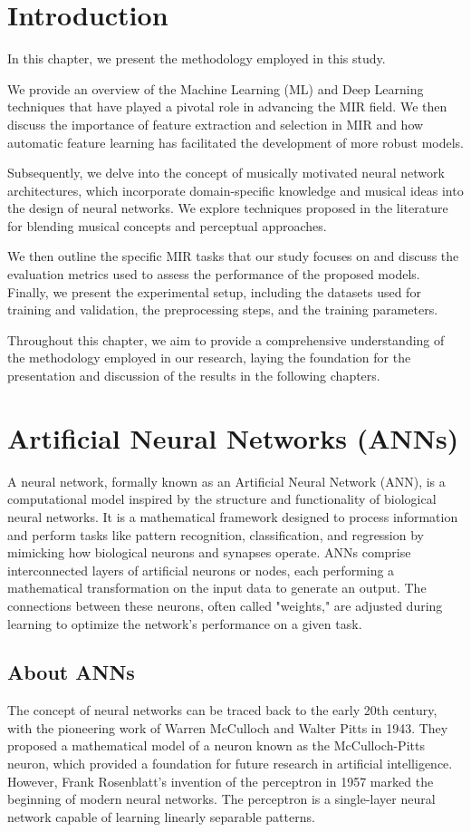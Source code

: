 \section{Introduction}

In this chapter, we present the methodology employed in this study.

We provide an overview of the Machine Learning (ML) and Deep Learning techniques that have played a pivotal role in advancing the MIR field. We then discuss the importance of feature extraction and selection in MIR and how automatic feature learning has facilitated the development of more robust models.

Subsequently, we delve into the concept of musically motivated neural network architectures, which incorporate domain-specific knowledge and musical ideas into the design of neural networks. We explore techniques proposed in the literature for blending musical concepts and perceptual approaches.

We then outline the specific MIR tasks that our study focuses on and discuss the evaluation metrics used to assess the performance of the proposed models. Finally, we present the experimental setup, including the datasets used for training and validation, the preprocessing steps, and the training parameters.

Throughout this chapter, we aim to provide a comprehensive understanding of the methodology employed in our research, laying the foundation for the presentation and discussion of the results in the following chapters.

\section{Artificial Neural Networks (ANNs)}
A neural network, formally known as an Artificial Neural Network (ANN), is a computational model inspired by the structure and functionality of biological neural networks. It is a mathematical framework designed to process information and perform tasks like pattern recognition, classification, and regression by mimicking how biological neurons and synapses operate. ANNs comprise interconnected layers of artificial neurons or nodes, each performing a mathematical transformation on the input data to generate an output. The connections between these neurons, often called "weights," are adjusted during learning to optimize the network's performance on a given task.

\subsection{About ANNs}
The concept of neural networks can be traced back to the early 20th century, with the pioneering work of Warren McCulloch and Walter Pitts in 1943. They proposed a mathematical model of a neuron known as the McCulloch-Pitts neuron, which provided a foundation for future research in artificial intelligence. However, Frank Rosenblatt's invention of the perceptron in 1957 marked the beginning of modern neural networks. The perceptron is a single-layer neural network capable of learning linearly separable patterns.


